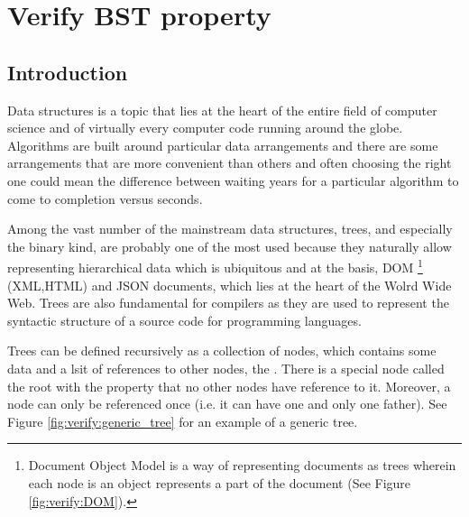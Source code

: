 %

\chapter{Verify BST property}
\label{ch:verify_BST}
\section*{Introduction}
Data structures is a topic that lies at the heart of the entire field of computer science and of virtually every computer code running around the globe.
Algorithms are built around particular data arrangements and there are some arrangements that are more convenient than others 
and often choosing the right one could mean the difference between waiting years for a particular algorithm to come to completion versus seconds. 

Among the vast number of the mainstream data structures, trees, and especially the binary kind, are probably one of the most used because they naturally allow representing hierarchical data which is ubiquitous and at the basis, DOM \footnote{Document Object Model is a way of representing documents as trees wherein each node is an object represents a part of the document (See Figure \ref{fig:verify:DOM}).} (XML,HTML) and  JSON documents, which lies at the heart of the Wolrd Wide Web.
Trees are also fundamental for compilers as they are used to represent the syntactic structure of a source code for programming languages.

Trees can be defined recursively as a collection of nodes, which contains some data and a lsit of references to other nodes, the . There is a special node called the root with the property that no other nodes have reference to it. Moreover, a node can only be referenced once (i.e. it can have one and only one father). See Figure \ref{fig:verify:generic_tree} for an example of a generic tree.



